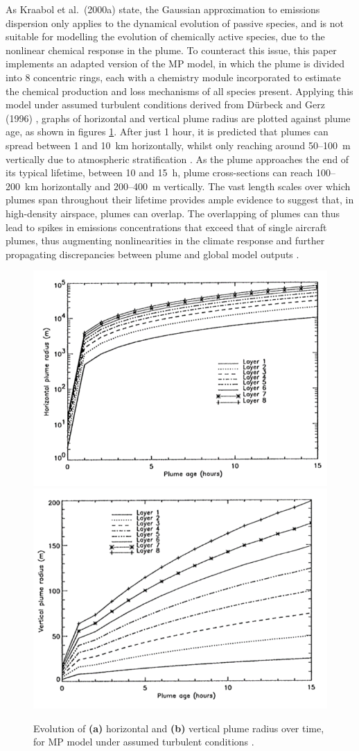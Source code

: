 As Kraabol et al.\ (2000a) \cite{Kraabol2000a} state, the Gaussian approximation to emissions dispersion only applies to the dynamical evolution of passive species, and is not suitable for modelling the evolution of chemically active species, due to the nonlinear chemical response in the plume. To counteract this issue, this paper implements an adapted version of the MP model, in which the plume is divided into 8 concentric rings, each with a chemistry module incorporated to estimate the chemical production and loss mechanisms of all species present. Applying this model under assumed turbulent conditions derived from D{\"u}rbeck and Gerz (1996) \cite{Durbeck1996}, graphs of horizontal and vertical plume radius are plotted against plume age, as shown in figures \ref{Kraabol}. After just 1 hour, it is predicted that plumes can spread between 1 and 10~km horizontally, whilst only reaching around 50--100~m vertically due to atmospheric stratification \cite{Durbeck1995}. As the plume approaches the end of its typical lifetime, between 10 and 15~h, plume cross-sections can reach 100--200~km horizontally and 200--400~m vertically. The vast length scales over which plumes span throughout their lifetime provides ample evidence to suggest that, in high-density airspace, plumes can overlap. The overlapping of plumes can thus lead to spikes in emissions concentrations that exceed that of single aircraft plumes, thus augmenting nonlinearities in the climate response and further propagating discrepancies between plume and global model outputs \cite{Schlager1997}. 


\begin{figure}[H]
	\centering
	\subfloat
		{
\centering
		\includegraphics[width=.36\textwidth]{Kraabol1.png}
		}
	\subfloat
		{
\centering
		\includegraphics[width=.36\textwidth]{Kraabol2.png}
		}
	\caption{Evolution of \textbf{(a)} horizontal and \textbf{(b)} vertical plume radius over time, for MP model under assumed turbulent conditions \cite{Kraabol2000a}.}
	\label{Kraabol}
\end{figure}

